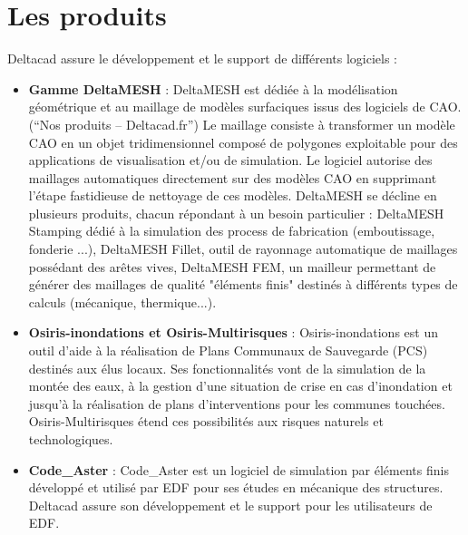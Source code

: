 \section{Les produits}
Deltacad assure le développement et le support de différents logiciels :
\begin{itemize}
\item \textbf{Gamme DeltaMESH} : DeltaMESH est dédiée à la modélisation géométrique et au maillage de modèles surfaciques issus des logiciels de CAO. (“Nos produits – Deltacad.fr”) Le maillage consiste à transformer un modèle CAO en un objet tridimensionnel composé de polygones exploitable pour des applications de visualisation et/ou de simulation. Le logiciel autorise des maillages automatiques directement sur des modèles CAO en supprimant l’étape 
fastidieuse de nettoyage de ces modèles. DeltaMESH se décline en plusieurs 
produits, chacun répondant à un besoin particulier : DeltaMESH Stamping dédié 
à la simulation des process de fabrication (emboutissage, fonderie ...), 
DeltaMESH Fillet, outil de rayonnage automatique de maillages possédant des 
arêtes vives, DeltaMESH FEM, un mailleur permettant de générer des maillages 
de qualité "éléments finis" destinés à différents types de calculs (mécanique, thermique...).
\item \textbf{Osiris-inondations et Osiris-Multirisques} : Osiris-inondations est un outil d'aide à la réalisation de Plans Communaux de Sauvegarde (PCS) destinés aux élus locaux. Ses fonctionnalités vont de la simulation de la montée des eaux, à la gestion d'une situation de crise en cas d'inondation et jusqu'à la réalisation de plans d'interventions pour les communes touchées. Osiris-Multirisques étend ces possibilités aux risques naturels et technologiques.
\item \textbf{Code\_Aster} : Code\_Aster est un logiciel de simulation par éléments finis développé et utilisé par EDF pour ses études en mécanique des structures. Deltacad assure son développement et le support pour les utilisateurs de EDF.
\end{itemize}
